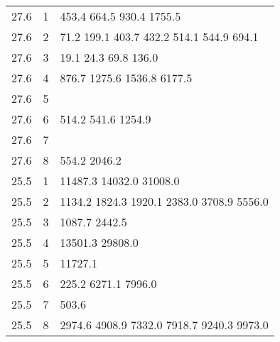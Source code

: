 \documentclass {book}
\begin{document}
\begin{sidebar}
\begin{table}
\begin{tabular}{ccl}
 27.6& 1  &  453.4\hspace{0.02in} 664.5\hspace{0.02in} 930.4\hspace{0.02in} 1755.5\\
 27.6& 2  &  71.2\hspace{0.02in} 199.1\hspace{0.02in} 403.7\hspace{0.02in} 432.2\hspace{0.02in} 514.1\hspace{0.02in} 544.9\hspace{0.02in} 694.1\\
 27.6& 3  &  19.1\hspace{0.02in} 24.3\hspace{0.02in} 69.8\hspace{0.02in} 136.0\\
 27.6& 4  &  876.7\hspace{0.02in} 1275.6\hspace{0.02in} 1536.8\hspace{0.02in} 6177.5\\
 27.6& 5  &  \\
 27.6& 6  &  514.2\hspace{0.02in} 541.6\hspace{0.02in} 1254.9\\
 27.6& 7  &  \\
 27.6& 8  &  554.2\hspace{0.02in} 2046.2\\

 25.5& 1  &  11487.3\hspace{0.02in} 14032.0\hspace{0.02in} 31008.0\\
 25.5& 2  &  1134.2\hspace{0.02in} 1824.3\hspace{0.02in} 1920.1\hspace{0.02in} 2383.0\hspace{0.02in} 3708.9\hspace{0.02in} 5556.0\\
 25.5& 3  &  1087.7\hspace{0.02in} 2442.5\\
 25.5& 4  &  13501.3\hspace{0.02in} 29808.0\\
 25.5& 5  &  11727.1\\
 25.5& 6  &  225.2\hspace{0.02in} 6271.1\hspace{0.02in} 7996.0\\
 25.5& 7  &  503.6\\
 25.5& 8  &  2974.6\hspace{0.02in} 4908.9\hspace{0.02in} 7332.0\hspace{0.02in} 7918.7\hspace{0.02in} 9240.3\hspace{0.02in} 9973.0\\


\end{tabular}
\end{table}
\end{sidebar}
\end{document}
